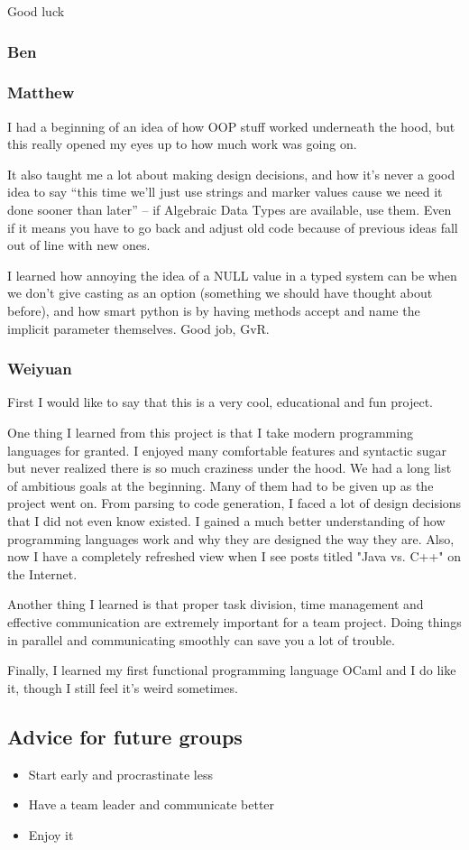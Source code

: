 Good luck

\subsubsection*{ Ben}

\subsubsection*{ Matthew}
I had a beginning of an idea of how OOP stuff worked underneath the hood, but this really opened my eyes up to how much work was going on.

It also taught me a lot about making design decisions, and how it's never a good idea to say ``this time we'll just use strings and marker values cause we need it done sooner than later'' -- if Algebraic Data Types are available, use them. Even if it means you 
have to go back and adjust old code because of previous ideas fall out of line with new ones.

I learned how annoying the idea of a NULL value in a typed system can be when we don't give casting as an option (something we should have thought about before), and how smart python is by having methods accept and name the implicit parameter themselves. Good 
job, GvR.

\subsubsection*{Weiyuan}
First I would like to say that this is a very cool, educational and fun project. 

One thing I learned from this project is that I take modern programming languages for granted. I enjoyed many comfortable features and syntactic sugar but never realized there is so much craziness under the hood. We had a long list of ambitious goals at the beginning. Many of them had to be given up as the project went on. From parsing to code generation, I faced a lot of design decisions that I did not even know existed. I gained a much better understanding of how programming languages work and why they are designed the way they are. Also, now I have a completely refreshed view when I see posts titled "Java vs. C++" on the Internet.

Another thing I learned is that proper task division, time management and effective communication are extremely important for a team project. Doing things in parallel and communicating smoothly can save you a lot of trouble.

Finally, I learned my first functional programming language OCaml and I do like it, though I still feel it's weird sometimes.

\subsection{Advice for future groups}
\begin{itemize}
  \item Start early and procrastinate less
  \item Have a team leader and communicate better
  \item Enjoy it
\end{itemize}
